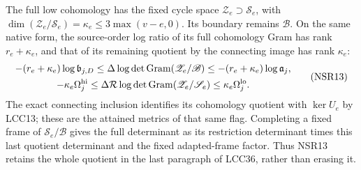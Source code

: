 \documentclass[11pt,a4paper]{article}
\begin{document}
The full low cohomology has the fixed cycle space
$\mathscr Z_e\supset\mathscr S_e$, with
$\dim(\mathscr Z_e/\mathscr S_e)=\kappa_e\le3\max(v-e,0)$.
Its boundary remains $\mathscr B$. On the same native
form, the source-order log ratio of its full cohomology
Gram has rank $r_e+\kappa_e$, and that of its remaining
quotient by the connecting image has rank $\kappa_e$:
\[
 \begin{gathered}
 -(r_e+\kappa_e)\log\mathfrak b_{j,D}
 \le\Delta\log\det\operatorname{Gram}(\mathscr Z_e/\mathscr B)
 \le-(r_e+\kappa_e)\log\mathfrak a_j,\\
 -\kappa_e\Omega_j^{\rm hi}\le
 \Delta\mathcal R\log\det\operatorname{Gram}
                          (\mathscr Z_e/\mathscr S_e)
 \le\kappa_e\Omega_j^{\rm lo}.
 \end{gathered}\tag{NSR13}
\]
The exact connecting inclusion identifies its cohomology
quotient with $\ker U_e$ by LCC13; these are the attained
metrics of that same flag. Completing a fixed frame of
$\mathscr S_e/\mathscr B$ gives the full determinant
as its restriction determinant times this last quotient
determinant and the fixed adapted-frame factor. Thus
NSR13 retains the whole quotient in the last paragraph
of LCC36, rather than erasing it.
\end{document}
